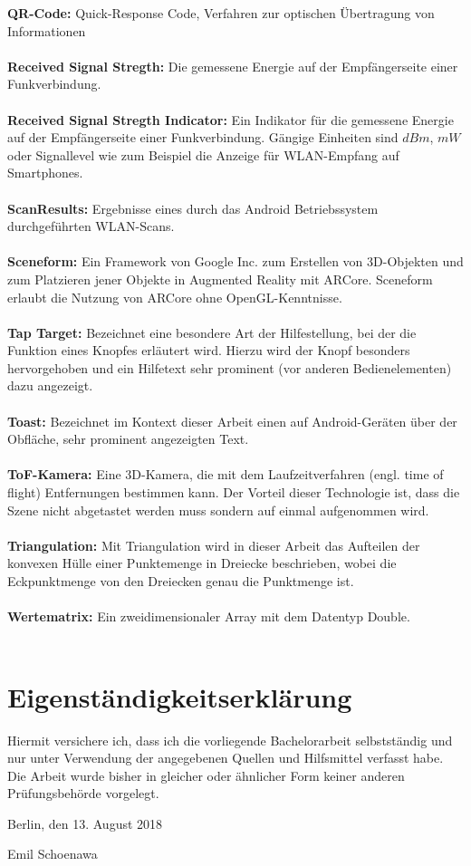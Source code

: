 \documentclass[10pt]{scrartcl}
\begin{document}
\textbf{QR-Code:} Quick-Response Code, Verfahren zur optischen Übertragung von Informationen\\~\\
\textbf{Received Signal Stregth:} Die gemessene Energie auf der Empfängerseite einer Funkverbindung.\\~\\
\textbf{Received Signal Stregth Indicator:} Ein Indikator für die gemessene Energie auf der Empfängerseite einer Funkverbindung. Gängige Einheiten sind $dBm$, $mW$ oder Signallevel wie zum Beispiel die Anzeige für WLAN-Empfang auf Smartphones.\\~\\
\textbf{ScanResults:} Ergebnisse eines durch das Android Betriebssystem durchgeführten WLAN-Scans.\\~\\
\textbf{Sceneform:} Ein Framework von Google Inc. zum Erstellen von 3D-Objekten und zum Platzieren jener Objekte in Augmented Reality mit ARCore. Sceneform erlaubt die Nutzung von ARCore ohne OpenGL-Kenntnisse.\\~\\
\textbf{Tap Target:} Bezeichnet eine besondere Art der Hilfestellung, bei der die Funktion eines Knopfes erläutert wird. Hierzu wird der Knopf besonders hervorgehoben und ein Hilfetext sehr prominent (vor anderen Bedienelementen) dazu angezeigt.\\~\\
\textbf{Toast:} Bezeichnet im Kontext dieser Arbeit einen auf Android-Geräten über der Obfläche, sehr prominent angezeigten Text.\\~\\
\textbf{ToF-Kamera:} Eine 3D-Kamera, die mit dem Laufzeitverfahren (engl. time of flight) Entfernungen bestimmen kann. Der Vorteil dieser Technologie ist, dass die Szene nicht abgetastet werden muss sondern auf einmal aufgenommen wird.\\~\\
\textbf{Triangulation:} Mit Triangulation wird in dieser Arbeit das Aufteilen der konvexen Hülle einer Punktemenge in Dreiecke beschrieben, wobei die Eckpunktmenge von den Dreiecken genau die Punktmenge ist.\\~\\
\textbf{Wertematrix:} Ein zweidimensionaler Array mit dem Datentyp Double.\\~\\

\newpage
\section*{Eigenständigkeitserklärung}
Hiermit versichere ich, dass ich die vorliegende Bachelorarbeit selbstständig und nur unter Verwendung der angegebenen Quellen und Hilfsmittel verfasst habe. Die Arbeit wurde bisher in gleicher oder ähnlicher Form keiner anderen Prüfungsbehörde vorgelegt.

\vskip 1cm

Berlin, den 13. August 2018

\vskip 1.5cm

Emil Schoenawa
\end{document}
